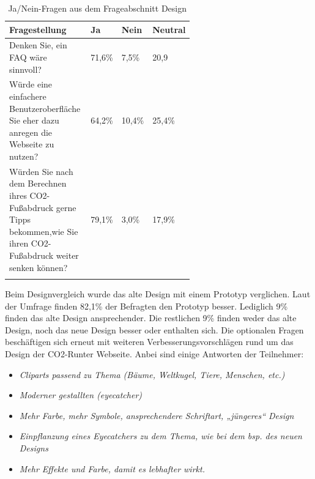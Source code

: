 \begin{longtable}{|p{0.6\linewidth}|l|l|l|}
    \hline
    \textbf{Fragestellung}                                                                                                                                            & \textbf{Ja} & \textbf{Nein} & \textbf{Neutral} \\ \hline
    \endfirsthead

    Denken Sie, ein FAQ wäre sinnvoll?                                                                                                                                & 71,6\%      & 7,5\%         & 20,9             \\ \hline
    Würde eine einfachere Benutzeroberfläche Sie eher                    dazu anregen die Webseite zu nutzen?                                                         & 64,2\%      & 10,4\%        & 25,4\%           \\ \hline
    Würden Sie nach dem Berechnen                                        ihres CO2-Fußabdruck gerne Tipps bekommen,wie Sie ihren CO2-Fußabdruck weiter senken können? & 79,1\%      & 3,0\%         & 17,9\%           \\ \hline
    \caption{Ja/Nein-Fragen aus dem Frageabschnitt Design}
    \label{designFragen}
    \\
\end{longtable}

Beim Designvergleich wurde das alte Design mit einem Prototyp verglichen.
Laut der Umfrage finden 82,1\% der Befragten den Prototyp besser.
Lediglich 9\% finden das alte Design ansprechender.
Die restlichen 9\% finden weder das alte Design, noch das neue Design besser oder enthalten sich.
Die optionalen Fragen beschäftigen sich erneut mit weiteren Verbesserungsvorschlägen rund um das Design der CO2-Runter Webseite.
Anbei sind einige Antworten der Teilnehmer:

\begin{itemize}
    \item \textit{Cliparts passend zu Thema (Bäume, Weltkugel, Tiere, Menschen, etc.)}
    \item \textit{Moderner gestallten (eyecatcher)}
    \item \textit{Mehr Farbe, mehr Symbole, ansprechendere Schriftart, „jüngeres“ Design}
    \item \textit{Einpflanzung eines Eyecatchers zu dem Thema, wie bei dem bsp. des neuen Designs }
    \item \textit{Mehr Effekte und Farbe, damit es lebhafter wirkt.}
\end{itemize}

